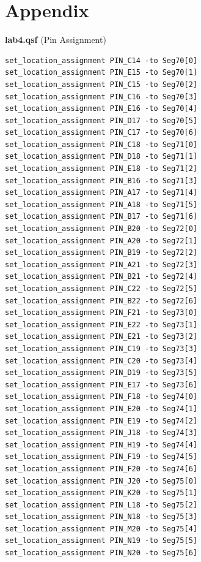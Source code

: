 \documentclass[12pt]{article}
\begin{document}
\section*{Appendix} \label{section:Appendix}

\begin{center}
  \textbf{lab4.qsf} (Pin Assignment)
\end{center}

\begin{verbatim}
set_location_assignment PIN_C14 -to Seg70[0]
set_location_assignment PIN_E15 -to Seg70[1]
set_location_assignment PIN_C15 -to Seg70[2]
set_location_assignment PIN_C16 -to Seg70[3]
set_location_assignment PIN_E16 -to Seg70[4]
set_location_assignment PIN_D17 -to Seg70[5]
set_location_assignment PIN_C17 -to Seg70[6]
set_location_assignment PIN_C18 -to Seg71[0]
set_location_assignment PIN_D18 -to Seg71[1]
set_location_assignment PIN_E18 -to Seg71[2]
set_location_assignment PIN_B16 -to Seg71[3]
set_location_assignment PIN_A17 -to Seg71[4]
set_location_assignment PIN_A18 -to Seg71[5]
set_location_assignment PIN_B17 -to Seg71[6]
set_location_assignment PIN_B20 -to Seg72[0]
set_location_assignment PIN_A20 -to Seg72[1]
set_location_assignment PIN_B19 -to Seg72[2]
set_location_assignment PIN_A21 -to Seg72[3]
set_location_assignment PIN_B21 -to Seg72[4]
set_location_assignment PIN_C22 -to Seg72[5]
set_location_assignment PIN_B22 -to Seg72[6]
set_location_assignment PIN_F21 -to Seg73[0]
set_location_assignment PIN_E22 -to Seg73[1]
set_location_assignment PIN_E21 -to Seg73[2]
set_location_assignment PIN_C19 -to Seg73[3]
set_location_assignment PIN_C20 -to Seg73[4]
set_location_assignment PIN_D19 -to Seg73[5]
set_location_assignment PIN_E17 -to Seg73[6]
set_location_assignment PIN_F18 -to Seg74[0]
set_location_assignment PIN_E20 -to Seg74[1]
set_location_assignment PIN_E19 -to Seg74[2]
set_location_assignment PIN_J18 -to Seg74[3]
set_location_assignment PIN_H19 -to Seg74[4]
set_location_assignment PIN_F19 -to Seg74[5]
set_location_assignment PIN_F20 -to Seg74[6]
set_location_assignment PIN_J20 -to Seg75[0]
set_location_assignment PIN_K20 -to Seg75[1]
set_location_assignment PIN_L18 -to Seg75[2]
set_location_assignment PIN_N18 -to Seg75[3]
set_location_assignment PIN_M20 -to Seg75[4]
set_location_assignment PIN_N19 -to Seg75[5]
set_location_assignment PIN_N20 -to Seg75[6]
\end{verbatim}
\end{document}
